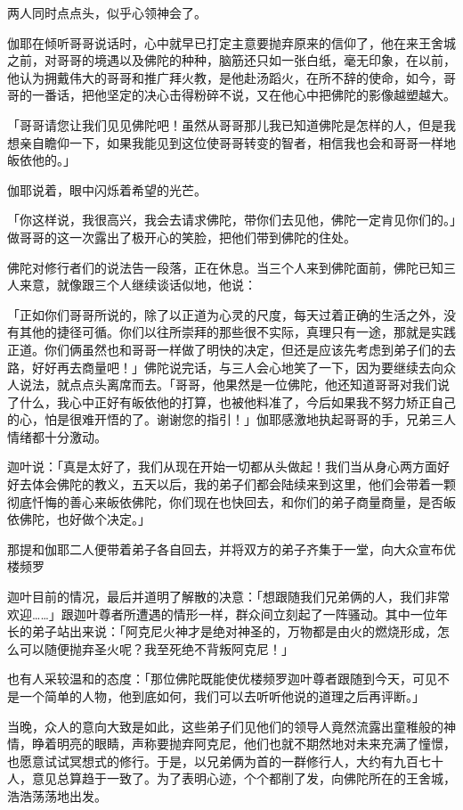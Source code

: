\documentclass[12pt,twoside,openany]{book}
\begin{document}
两人同时点点头，似乎心领神会了。

伽耶在倾听哥哥说话时，心中就早已打定主意要抛弃原来的信仰了，他在来王舍城之前，对哥哥的境遇以及佛陀的种种，脑筋还只如一张白纸，毫无印象，在以前，他认为拥戴伟大的哥哥和推广拜火教，是他赴汤蹈火，在所不辞的使命，如今，哥哥的一番话，把他坚定的决心击得粉碎不说，又在他心中把佛陀的影像越塑越大。

「哥哥请您让我们见见佛陀吧！虽然从哥哥那儿我已知道佛陀是怎样的人，但是我想亲自瞻仰一下，如果我能见到这位使哥哥转变的智者，相信我也会和哥哥一样地皈依他的。」

伽耶说着，眼中闪烁着希望的光芒。

「你这样说，我很高兴，我会去请求佛陀，带你们去见他，佛陀一定肯见你们的。」做哥哥的这一次露出了极开心的笑脸，把他们带到佛陀的住处。

佛陀对修行者们的说法告一段落，正在休息。当三个人来到佛陀面前，佛陀已知三人来意，就像跟三个人继续谈话似地，他说：

「正如你们哥哥所说的，除了以正道为心灵的尺度，每天过着正确的生活之外，没有其他的捷径可循。你们以往所崇拜的那些很不实际，真理只有一途，那就是实践正道。你们俩虽然也和哥哥一样做了明快的决定，但还是应该先考虑到弟子们的去路，好好再去商量吧！」佛陀说完话，与三人会心地笑了一下，因为要继续去向众人说法，就点点头离席而去。「哥哥，他果然是一位佛陀，他还知道哥哥对我们说了什么，我心中正好有皈依他的打算，也被他料准了，今后如果我不努力矫正自己的心，怕是很难开悟的了。谢谢您的指引！」伽耶感激地执起哥哥的手，兄弟三人情绪都十分激动。

迦叶说：「真是太好了，我们从现在开始一切都从头做起！我们当从身心两方面好好去体会佛陀的教义，五天以后，我的弟子们都会陆续来到这里，他们会带着一颗彻底忏悔的善心来皈依佛陀，你们现在也快回去，和你们的弟子商量商量，是否皈依佛陀，也好做个决定。」

那提和伽耶二人便带着弟子各自回去，并将双方的弟子齐集于一堂，向大众宣布优楼频罗



迦叶目前的情况，最后并道明了解散的决意：「想跟随我们兄弟俩的人，我们非常欢迎……」跟迦叶尊者所遭遇的情形一样，群众间立刻起了一阵骚动。其中一位年长的弟子站出来说：「阿克尼火神才是绝对神圣的，万物都是由火的燃烧形成，怎么可以随便抛弃圣火呢？我至死绝不背叛阿克尼！」

也有人采较温和的态度：「那位佛陀既能使优楼频罗迦叶尊者跟随到今天，可见不是一个简单的人物，他到底如何，我们可以去听听他说的道理之后再评断。」

当晚，众人的意向大致是如此，这些弟子们见他们的领导人竟然流露出童稚般的神情，睁着明亮的眼睛，声称要抛弃阿克尼，他们也就不期然地对未来充满了憧憬，也愿意试试冥想式的修行。于是，以兄弟俩为首的一群修行人，大约有九百七十人，意见总算趋于一致了。为了表明心迹，个个都削了发，向佛陀所在的王舍城，浩浩荡荡地出发。
\end{document}
